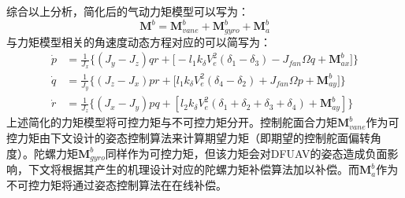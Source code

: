 综合以上分析，简化后的气动力矩模型可以写为：
\begin{equation}
    \boldsymbol{M}^b=\boldsymbol{M}_{vane}^b+\boldsymbol{M}_{gyro}^b+\boldsymbol{M}_{a}^b
    \label{3-20}
\end{equation}
与力矩模型相关的角速度动态方程对应的可以简写为：
\begin{equation}
    \begin{aligned}
        \dot{p}  &=\frac{1}{J_x}\Bigg\{ (J_y-J_z)qr+
        \big[- l_1k_\delta V_e^2(\delta_1 - \delta_3)-J_{fan}\Omega{q} +\boldsymbol{M}_{ax}^b\big]\Bigg\} \\
        \dot{q}  &=\frac{1}{J_y}\Bigg\{ (J_z-J_x)pr+
        \big[l_1k_\delta V_e^2(\delta_4 - \delta_2)+J_{fan}\Omega{p} +\boldsymbol{M}_{ay}^b\big]\Bigg\} \\
        \dot{r}  &=\frac{1}{J_z}\Bigg\{ (J_x-J_y)pq+
        \left[l_2k_\delta V_e^2(\delta_1 + \delta_2 + \delta_3 + \delta_4) + \boldsymbol{M}_{ay}^b\right]
        \Bigg\}
    \end{aligned}
    \label{3-21}
\end{equation}
上述简化的力矩模型将可控力矩与不可控力矩分开。控制舵面合力矩$\boldsymbol{M}_{vane}^b$作为可控力矩由下文设计的姿态控制算法来计算期望力矩（即期望的控制舵面偏转角度）。陀螺力矩$\boldsymbol{M}_{gyro}^b$同样作为可控力矩，但该力矩会对DFUAV的姿态造成负面影响，下文将根据其产生的机理设计对应的陀螺力矩补偿算法加以补偿。而$\boldsymbol{M}_{a}^b$作为不可控力矩将通过姿态控制算法在在线补偿。




